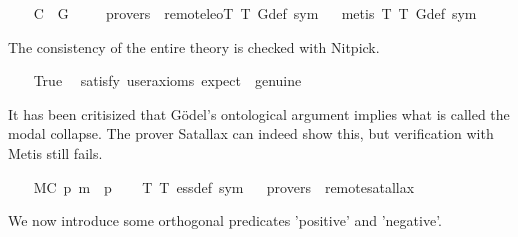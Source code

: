 \begin{isabellebody}
%
\isadelimproof
%
\endisadelimproof
\isanewline
\isanewline
\ \ \isamarkupfalse%
\ C{}{\isacharcolon}\ {\isachardoublequoteopen}{\isacharbrackleft}{\isasymexists}\ G{\isacharbrackright}{\isachardoublequoteclose}\ \isanewline
\ \ \isamarkupfalse%
\ {\isacharbrackleft}provers\ {\isacharequal}\ remote{\isacharunderscore}leo{}{\isacharbrackright}{\isacharparenleft}T{}\ T{}\ G{\isacharunderscore}def\ sym{\isacharparenright}%
\isadelimproof
\ %
\endisadelimproof
%
\isatagproof
{}\isamarkupfalse%
\ {\isacharparenleft}metis\ T{}\ T{}\ G{\isacharunderscore}def\ sym{\isacharparenright}%
\endisatagproof
{\isafoldproof}%
%
\isadelimproof
%
\endisadelimproof
%
\begin{isamarkuptext}%
The consistency of the entire theory is checked with Nitpick.%
\end{isamarkuptext}%
\isamarkuptrue%
\ \ \isamarkupfalse%
\ True\ \isamarkupfalse%
\ {\isacharbrackleft}satisfy{\isacharcomma}\ user{\isacharunderscore}axioms{\isacharcomma}\ expect\ {\isacharequal}\ genuine{\isacharbrackright}%
\isadelimproof
\ %
\endisadelimproof
%
\isatagproof
{}\isamarkupfalse%
%
\endisatagproof
{\isafoldproof}%
%
\isadelimproof
%
\endisadelimproof
%
\begin{isamarkuptext}%
It has been critisized that G\"odel's ontological argument implies what is called the 
modal collapse. The prover Satallax \cite{Satallax} can indeed show this, but verification with 
Metis still fails.%
\end{isamarkuptext}%
\isamarkuptrue%
\ \ \isamarkupfalse%
\ MC{\isacharcolon}\ {\isachardoublequoteopen}{\isacharbrackleft}p\ m{\isasymRightarrow}\ {\isacharparenleft}{\isasymbox}\ p{\isacharparenright}{\isacharbrackright}{\isachardoublequoteclose}\isanewline
%
\isadelimproof
\ \ %
\endisadelimproof
%
\isatagproof
{}\isamarkupfalse%
\ T{}\ T{}\ ess{\isacharunderscore}def\ sym%
\endisatagproof
{\isafoldproof}%
%
\isadelimproof
%
\endisadelimproof
\ \isamarkupfalse%
\ {\isacharbrackleft}provers\ {\isacharequal}\ remote{\isacharunderscore}satallax{\isacharbrackright}%
\isadelimproof
\ %
\endisadelimproof
%
\isatagproof
{}\isamarkupfalse%
%
\endisatagproof
{\isafoldproof}%
%
\isadelimproof
%
\endisadelimproof
%
\begin{isamarkuptext}%
We now introduce some orthogonal predicates 'positive' and 'negative'.%

\end{isamarkuptext}
\end{isabellebody}
